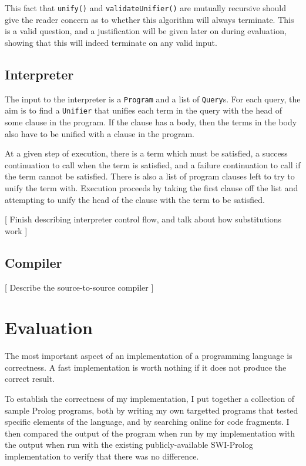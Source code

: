 \documentclass[12pt]{article}
\begin{document}
This fact that \verb|unify()| and \verb|validateUnifier()| are mutually recursive should give the reader concern as to whether this algorithm will always terminate. 
This is a valid question, and a justification will be given later on during evaluation, showing that this will indeed terminate on any valid input.

\subsection{Interpreter}

The input to the interpreter is a \verb|Program| and a list of \verb|Query|s. 
For each query, the aim is to find a \verb|Unifier| that unifies each term in the query with the head of some clause in the program. 
If the clause has a body, then the terms in the body also have to be unified with a clause in the program.

At a given step of execution, there is a term which must be satisfied, a success continuation to call when the term is satisfied, and a failure continuation to call if the term cannot be satisfied. There is also a list of program clauses left to try to unify the term with. 
Execution proceeds by taking the first clause off the list and attempting to unify the head of the clause with the term to be satisfied. 

[ Finish describing interpreter control flow, and talk about how substitutions work ]

\subsection{Compiler}

[ Describe the source-to-source compiler ]

\newpage

\section{Evaluation}



The most important aspect of an implementation of a programming language is correctness. 
A fast implementation is worth nothing if it does not produce the correct result.

To establish the correctness of my implementation, I put together a collection of sample Prolog programs, both by writing my own targetted programs that tested specific elements of the language, and by searching online for code fragments. 
I then compared the output of the program when run by my implementation with the output when run with the existing publicly-available SWI-Prolog implementation to verify that there was no difference.
\end{document}
